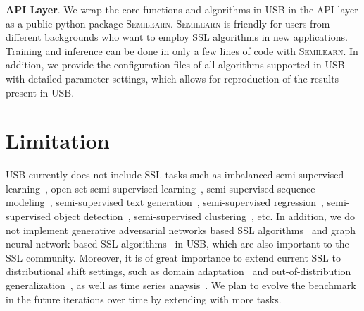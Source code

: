 \documentclass{article}
\newcommand{\revision}[1]{{\color{black}{#1}}}
\begin{document}
\textbf{API Layer}. We wrap the core functions and algorithms in USB in the API layer as a public python package \textsc{Semilearn}. \textsc{Semilearn} is friendly for users from different backgrounds who want to employ SSL algorithms in new applications. Training and inference can be done in only a few lines of code with \textsc{Semilearn}. In addition, we provide the configuration files of all algorithms supported in USB with detailed parameter settings, which allows for reproduction of the results present in USB. 

\section{Limitation}

\revision{Our primary focus is on semi-supervised classification in this paper. However, there are other SSL tasks that the SSL community should not ignore.} USB currently does not include SSL tasks such as imbalanced semi-supervised learning~\cite{kim2020distribution,li2011semi,hyun2020class,wei2021crest,yang2020rethinking,fan2021cossl,oh2021distribution}, open-set semi-supervised learning~\cite{saito2021openmatch,guo2020safe,yu2020multi,luo2021consistency,huang2021universal}, semi-supervised sequence modeling~\cite{clark2018semi,chen2020seqvat,li2005semi,dai2015semi,baskar2019semi,wang2022exploiting}, semi-supervised text generation~\cite{liu-etal-2022-semi,he2019revisiting,chen2021simple}, semi-supervised regression~\cite{wasserman2007statistical,jean2018semi,kostopoulos2018semi,zhou2005semi,li2017learning}, semi-supervised object detection~\cite{tang2016large,tang2021proposal,xu2021end,tang2021humble,gao2019note,liu2020unbiased}, semi-supervised clustering~\cite{basu2002semi,bair2013semi,grira2004unsupervised,basu2004probabilistic}, etc.
In addition, we do not implement generative adversarial networks based SSL algorithms~\cite{kingma2014semi,springenberg2015unsupervised,odena2016semi,denton2016semi} and graph neural network based SSL algorithms~\cite{verma2021graphmix,feng2020graph,sankar2019meta,gong2022self,zhao2020uncertainty} in USB, which are also important to the SSL community. Moreover, it is of great importance to extend current SSL to distributional shift settings, such as domain adaptation~\cite{wang2018visual, wang2017balanced} and out-of-distribution generalization~\cite{wang2022generalizing}, as well as time series anaysis~\cite{du2021adarnn}.
We plan to evolve the benchmark in the future iterations over time by extending with more tasks. 
\end{document}

